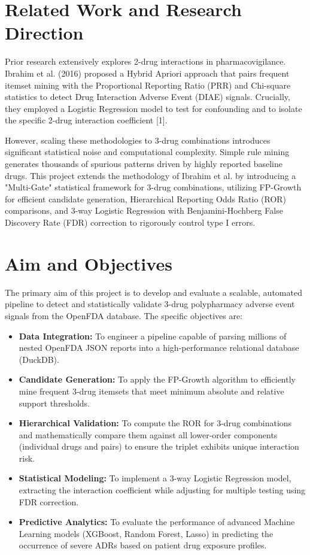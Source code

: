 \documentclass[11pt,a4paper]{article}
\begin{document}
\section*{Related Work and Research Direction}
Prior research extensively explores 2-drug interactions in pharmacovigilance. Ibrahim et al. (2016) proposed a Hybrid Apriori approach that pairs frequent itemset mining with the Proportional Reporting Ratio (PRR) and Chi-square statistics to detect Drug Interaction Adverse Event (DIAE) signals. Crucially, they employed a Logistic Regression model to test for confounding and to isolate the specific 2-drug interaction coefficient [1].

However, scaling these methodologies to 3-drug combinations introduces significant statistical noise and computational complexity. Simple rule mining generates thousands of spurious patterns driven by highly reported baseline drugs. This project extends the methodology of Ibrahim et al. by introducing a "Multi-Gate" statistical framework for 3-drug combinations, utilizing FP-Growth for efficient candidate generation, Hierarchical Reporting Odds Ratio (ROR) comparisons, and 3-way Logistic Regression with Benjamini-Hochberg False Discovery Rate (FDR) correction to rigorously control type I errors.

\section*{Aim and Objectives}
The primary aim of this project is to develop and evaluate a scalable, automated pipeline to detect and statistically validate 3-drug polypharmacy adverse event signals from the OpenFDA database. The specific objectives are:
\begin{itemize}
    \item \textbf{Data Integration:} To engineer a pipeline capable of parsing millions of nested OpenFDA JSON reports into a high-performance relational database (DuckDB).
    \item \textbf{Candidate Generation:} To apply the FP-Growth algorithm to efficiently mine frequent 3-drug itemsets that meet minimum absolute and relative support thresholds.
    \item \textbf{Hierarchical Validation:} To compute the ROR for 3-drug combinations and mathematically compare them against all lower-order components (individual drugs and pairs) to ensure the triplet exhibits unique interaction risk.
    \item \textbf{Statistical Modeling:} To implement a 3-way Logistic Regression model, extracting the interaction coefficient while adjusting for multiple testing using FDR correction.
    \item \textbf{Predictive Analytics:} To evaluate the performance of advanced Machine Learning models (XGBoost, Random Forest, Lasso) in predicting the occurrence of severe ADRs based on patient drug exposure profiles.
\end{itemize}
\end{document}
